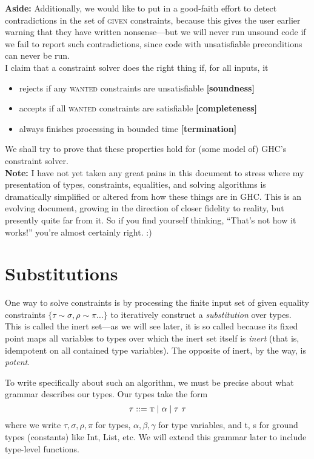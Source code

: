 \documentclass[10pt, letterpaper, oneside]{article}
\begin{document}
\textbf{Aside:} Additionally, we would like to put in a good-faith effort to detect contradictions in the set of \textsc{given} constraints, because this gives the user earlier warning that they have written nonsense---but we will never run unsound code if we fail to report such contradictions, since code with unsatisfiable preconditions can never be run.\\

I claim that a constraint solver does the right thing if, for all inputs, it
\begin{itemize}
\item rejects if any \textsc{wanted} constraints are unsatisfiable \textbf{[soundness]}
\item accepts if all \textsc{wanted} constraints are satisfiable \textbf{[completeness]}
\item always finishes processing in bounded time \textbf{[termination]}
\end{itemize}

We shall try to prove that these properties hold for (some model of) GHC's constraint solver.\\

\noindent\textbf{Note:} I have not yet taken any great pains in this document to stress where my presentation of types, constraints, equalities, and solving algorithms is dramatically simplified or altered from how these things are in GHC. This is an evolving document, growing in the direction of closer fidelity to reality, but presently quite far from it. So if you find yourself thinking, ``That's not how it works!'' you're almost certainly right. :)

\section{Substitutions}

One way to solve constraints is by processing the finite input set of {\sc given} equality constraints \(\{\tau \sim \sigma, \rho \sim \pi \dots\}\) to iteratively construct a \emph{substitution} over types. This is called the inert set---as we will see later, it is so called because its fixed point maps all variables to types over which the inert set itself is \emph{inert} (that is, idempotent on all contained type variables). The opposite of inert, by the way, is \emph{potent}.

To write specifically about such an algorithm, we must be precise about what grammar describes our types. Our types take the form
\begin{equation*}
  \tau ::= \text{\sc t} \mid \alpha \mid \tau\ \tau
\end{equation*}
where we write \(\tau, \sigma, \rho, \pi\) for types, \(\alpha, \beta, \gamma\) for type variables, and {\sc t}, {\sc s} for ground types (constants) like Int, List, etc. We will extend this grammar later to include type-level functions.
\end{document}

